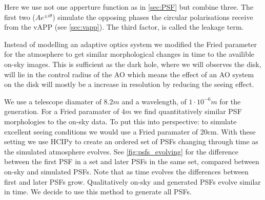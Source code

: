 Here we use not one apperture function as in \autoref{sec:PSF} but combine three. The first two ($Ae^{\pm i\theta}$) simulate the opposing phases the circular polarisations receive from the \ac{vAPP} (see \autoref{sec:vapp}). The third factor, is called the leakage term.

Instead of modelling an adaptive optics system we modified the Fried parameter for the atmosphere to get similar morphological changes in time to the availible on-sky images. This is sufficient as the dark hole, where we will observes the disk, will lie in the control radius of the \ac{AO} which means the effect of an \ac{AO} system on the disk will mostly be a increase in resolution by reducing the seeing effect.

We use a telescope diamater of $8.2m$ and a wavelength, of $1\cdot 10^{-6}m$ for the generation. For a Fried paramater of $4m$ we find quantitatively similar \ac{PSF}  morphologies to the on-sky data. To put this into perspective: to simulate excellent seeing conditions we would use a Fried paramater of 20cm. With these setting we use \ac{HCIPy} to create an ordered set of \acp{PSF} changing through time as the simulated atmosphere evolves. See \autoref{fig:psfs_evolving} for the difference between the first \ac{PSF} in a set and later \acp{PSF} in the same set, compared between on-sky and simulated \acp{PSF}. Note that as time evolves the differences between first and later \acp{PSF} grow. Qualitatively on-sky and generated \acp{PSF} evolve similar in time. We decide to use this method to generate all \acp{PSF}.


